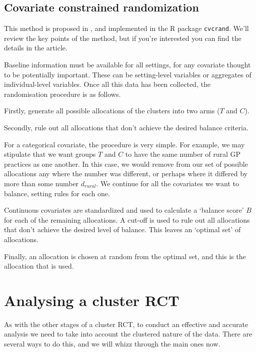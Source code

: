 \documentclass[
  openany]{book}
\theoremstyle{definition}
\theoremstyle{definition}
\theoremstyle{definition}
\theoremstyle{definition}
\theoremstyle{remark}
\begin{document}
\subsection{Covariate constrained randomization}\label{covariate-constrained-randomization}

This method is proposed in \citet{dickinson2015pragmatic}, and implemented in the R package \texttt{cvcrand}. We'll review the key points of the method, but if you're interested you can find the details in the article.

Baseline information must be available for all settings, for any covariate thought to be potentially important. These can be setting-level variables or aggregates of individual-level variables. Once all this data has been collected, the randomisation procedure is as follows.

Firstly, generate all possible allocations of the clusters into two arms (\(T\) and \(C\)).

Secondly, rule out all allocations that don't achieve the desired balance criteria.

For a categorical covariate, the procedure is very simple. For example, we may stipulate that we want groups \(T\) and \(C\) to have the same number of rural GP practices as one another. In this case, we would remove from our set of possible allocations any where the number was different, or perhaps where it differed by more than some number \(d_{rural}\). We continue for all the covariates we want to balance, setting rules for each one.

Continuous covariates are standardized and used to calculate a `balance score' \(B\) for each of the remaining allocations. A cut-off is used to rule out all allocations that don't achieve the desired level of balance. This leaves an `optimal set' of allocations.

Finally, an allocation is chosen at random from the optimal set, and this is the allocation that is used.

\section{Analysing a cluster RCT}\label{analysing-a-cluster-rct}

As with the other stages of a cluster RCT, to conduct an effective and accurate analysis we need to take into account the clustered nature of the data. There are several ways to do this, and we will whizz through the main ones now.
\end{document}
